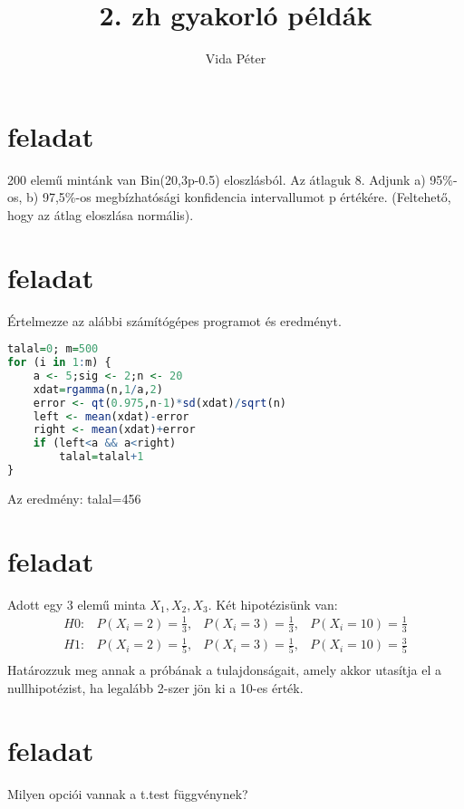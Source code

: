 \documentclass[]{article}
\title{2. zh gyakorl\'o p\'eld\'ak}
\author{Vida P\'eter}
\begin{document}
\maketitle

\begin{abstract}

\end{abstract}

\section{feladat}
200 elemű mintánk van Bin(20,3p-0.5) eloszlásból. Az átlaguk 8. Adjunk a) 95\%-os, b) 97,5\%-os megbízhatósági konfidencia intervallumot p értékére. (Feltehető, hogy az átlag eloszlása normális).

\section{feladat}
Értelmezze az alábbi számítógépes programot és eredményt.
\begin{lstlisting}[language=R]
talal=0; m=500
for (i in 1:m) {
	a <- 5;sig <- 2;n <- 20
	xdat=rgamma(n,1/a,2)
	error <- qt(0.975,n-1)*sd(xdat)/sqrt(n)
	left <- mean(xdat)-error
	right <- mean(xdat)+error
	if (left<a && a<right) 
		talal=talal+1
}
\end{lstlisting}
Az eredmény: talal=456

\section{feladat}
Adott egy 3 elemű minta $X_1, X_2, X_3$. 
Két hipotézisünk van:
\[ \begin{aligned}
H0: & P(X_i=2)=\frac{1}{3}, & P(X_i=3)=\frac{1}{3},& P(X_i=10)=\frac{1}{3} \\
H1: & P(X_i=2)=\frac{1}{5}, & P(X_i=3)=\frac{1}{5},& P(X_i=10)=\frac{3}{5} \\
\end{aligned} \]
Határozzuk meg annak a próbának a tulajdonságait, amely akkor utasítja el a
nullhipotézist, ha legalább 2-szer jön ki a 10-es érték. 

\section{feladat}
Milyen opciói vannak a t.test függvénynek?
\end{document}
